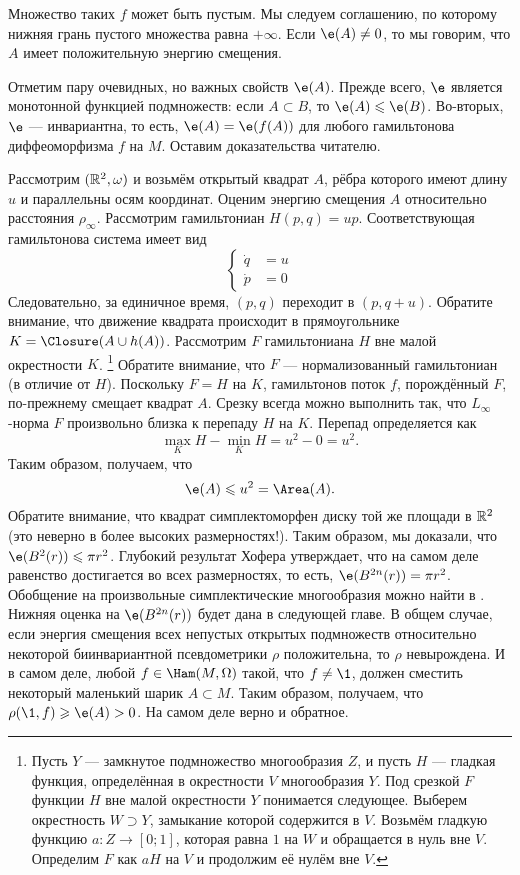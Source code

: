 Множество таких $f$ может быть пустым.
Мы  следуем соглашению, по которому нижняя грань пустого множества равна $+\infty$.
Если $\e (A) \ne 0$, то мы говорим, что $A$ имеет положительную энергию смещения.

Отметим пару очевидных, но важных свойств $\e(A)$.
Прежде всего, $\e$ является монотонной функцией подмножеств: если $A \subset B$, то $\e(A) \le \e(B)$.
Во-вторых, $\e$ --- инвариантна, то есть, $\e (A) = \e (f (A))$ для любого гамильтонова диффеоморфизма $f$ на $M$.
Оставим доказательства читателю.

Рассмотрим $(\mathbb{R}^2, \omega)$ и возьмём открытый квадрат $A$, рёбра которого имеют длину $u$ и параллельны осям координат.
Оценим энергию смещения $A$ относительно расстояния $\rho_\infty$.
Рассмотрим гамильтониан $H (p, q) = up$.
Соответствующая гамильтонова система имеет вид 
\[
\begin{cases}
\dot q &= u
\\
\dot p &= 0
\end{cases}
\]
Следовательно, за единичное время, $(p, q)$ переходит в $(p, q + u)$.
Обратите внимание, что движение квадрата происходит в прямоугольнике $K = \Closure (A \cup h (A))$.
Рассмотрим  $F$ гамильтониана $H$ вне малой окрестности $K$.%
\footnote{Пусть $Y$ --- замкнутое подмножество многообразия $Z$, и пусть $H$ --- гладкая функция, определённая в окрестности $V$ многообразия $Y$.
Под срезкой $F$ функции $H$ вне малой окрестности $Y$ понимается следующее.
Выберем окрестность $W\supset Y$, замыкание которой содержится в $V$.
Возьмём гладкую функцию $a\colon Z \to [0; 1]$, которая равна $1$ на $W$ и обращается в нуль вне $V$.
Определим $F$ как $aH$ на $V$ и продолжим её нулём вне $V$.}
Обратите внимание, что $F$ --- нормализованный гамильтониан (в отличие от $H$).
Поскольку $F = H$ на $K$, гамильтонов поток $f$, порождённый $F$, по-прежнему смещает квадрат $A$.
Срезку всегда можно выполнить так, что $L_\infty$-норма $F$ произвольно близка к перепаду $H$ на $K$.
Перепад определяется как 
\[\max_K H - \min_K H = u^2 - 0 = u^2.\]
Таким образом, получаем, что 
\[\e (A) \le u^2 = \Area (A).\]
Обратите внимание, что квадрат симплектоморфен диску той же площади в $\mathbb{R}^2$ (это неверно в более высоких размерностях!).
Таким образом, мы доказали, что $\e (B^2 (r)) \le \pi r^2$.
Глубокий результат Хофера \cite{H1} утверждает, что на самом деле равенство
достигается во всех размерностях, то есть, $\e (B^{2n} (r)) = \pi r^2$.
Обобщение на произвольные симплектические многообразия можно найти в \cite{LM1}.
Нижняя оценка на $\e(B^{2n} (r))$ будет дана в следующей главе.
В общем случае, если энергия смещения всех непустых открытых подмножеств относительно некоторой биинвариантной псевдометрики $\rho$ положительна, то $\rho$ невырождена.
И в самом деле, любой $f \in \Ham (M, \Omega)$ такой, что $f \ne \1$,
должен сместить некоторый маленький шарик $A \subset M$.
Таким образом, получаем, что $\rho (\1, f) \ge \e (A)> 0$.
На самом деле верно и обратное.

